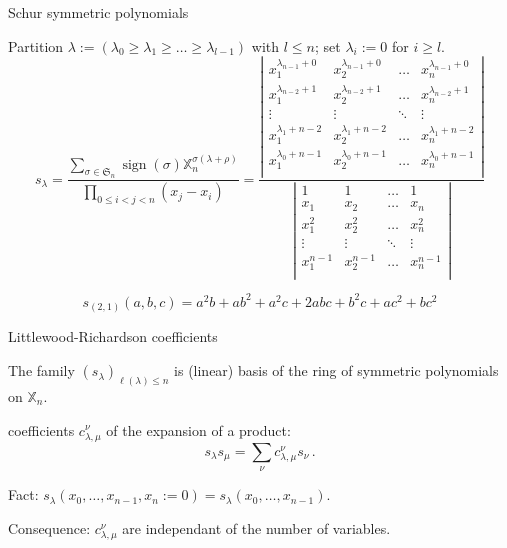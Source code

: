 \documentclass[compress,11pt]{beamer}
\newcommand{\XX}{{\mathbb X}}
\newcommand{\SG}{{\mathfrak S}}
\begin{document}
\begin{frame}{Schur symmetric polynomials}

  \begin{DEFN}
    \small Partition $\lambda := (\lambda_0\geq\lambda_1\geq\dots\geq\lambda_{l-1})$ with $l\leq
    n$; set $\lambda_i:=0$ for $i\geq l$.\\

    \[
    s_{\lambda} = 
    \frac{\sum_{\sigma\in\SG_n} \operatorname{sign}(\sigma)
      \XX_n^{\sigma(\lambda+\rho)}}%
    {\prod_{0\leq i<j<n} (x_j - x_i)}
    = \frac{\left|
       \begin{smallmatrix}
         x_1^{\lambda_{n-1}+0}  & x_2^{\lambda_{n-1}+0}   & \dots  & x_n^{\lambda_{n-1}+0}  \\
         x_1^{\lambda_{n-2}+1}  & x_2^{\lambda_{n-2}+1}   & \dots  & x_n^{\lambda_{n-2}+1}  \\
         \vdots & \vdots & \ddots & \vdots \\
         x_1^{\lambda_1+n-2}  & x_2^{\lambda_1+n-2}   & \dots  & x_n^{\lambda_1+n-2}  \\
         x_1^{\lambda_0+n-1}  & x_2^{\lambda_0+n-1}   & \dots  & x_n^{\lambda_0+n-1}  \\
      \end{smallmatrix}
      \right|
    }{\left|
       \begin{smallmatrix}
         1      & 1      & \dots  & 1     \\
         x_1    & x_2    & \dots  & x_n    \\
         x_1^2  & x_2^2   & \dots  & x_n^2  \\
         \vdots & \vdots & \ddots & \vdots \\
         x_1^{n-1}  & x_2^{n-1}   & \dots  & x_n^{n-1}  \\
      \end{smallmatrix}
      \right|
    }
    \]
  \end{DEFN}
  \[s_{(2,1)}(a,b,c) = a^2b + ab^2 + a^2c + 2abc + b^2c + ac^2 + bc^2\]
\end{frame}


\begin{frame}{Littlewood-Richardson coefficients}
  
  \begin{PROP}
    The family $(s_\lambda)_{\ell(\lambda) \leq n}$ is (linear) basis of the
    ring of symmetric polynomials on $\XX_n$.
  \end{PROP}
  
  \begin{DEFN}
    coefficients $c_{\lambda,\mu}^\nu$ of the expansion of a product:
    \[
    s_\lambda s_\mu = \sum_{\nu} c_{\lambda,\mu}^\nu s_\nu\,.
    \]
  \end{DEFN}
  Fact: $s_\lambda(x_0,\dots,x_{n-1}, x_n := 0) =
  s_\lambda(x_0,\dots,x_{n-1})$.

  Consequence: $c_{\lambda,\mu}^\nu$ are independant of the number of variables.
\end{frame}
\end{document}
